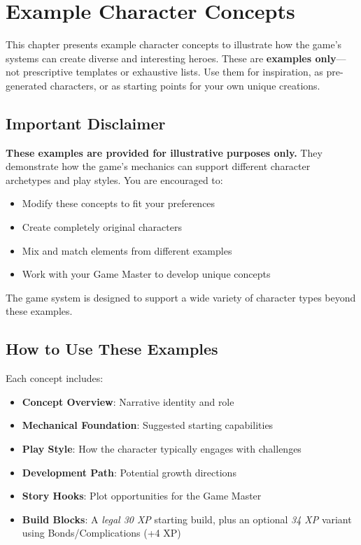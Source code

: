 
\chapter{Example Character Concepts}
\label{ch:example-concepts}

\begin{multicols}{2}

This chapter presents example character concepts to illustrate how the game's systems can create diverse and interesting heroes. These are \textbf{examples only}—not prescriptive templates or exhaustive lists. Use them for inspiration, as pre-generated characters, or as starting points for your own unique creations.

\section{Important Disclaimer}

\textbf{These examples are provided for illustrative purposes only.} They demonstrate how the game's mechanics can support different character archetypes and play styles. You are encouraged to:
\begin{itemize}
\item Modify these concepts to fit your preferences
\item Create completely original characters
\item Mix and match elements from different examples
\item Work with your Game Master to develop unique concepts
\end{itemize}

The game system is designed to support a wide variety of character types beyond these examples.

\section{How to Use These Examples}

Each concept includes:
\begin{itemize}
\item \textbf{Concept Overview}: Narrative identity and role
\item \textbf{Mechanical Foundation}: Suggested starting capabilities
\item \textbf{Play Style}: How the character typically engages with challenges
\item \textbf{Development Path}: Potential growth directions
\item \textbf{Story Hooks}: Plot opportunities for the Game Master
\item \textbf{Build Blocks}: A \emph{legal 30 XP} starting build, plus an optional \emph{34 XP} variant using Bonds/Complications (+4 XP)
\end{itemize}


\end{multicols}
